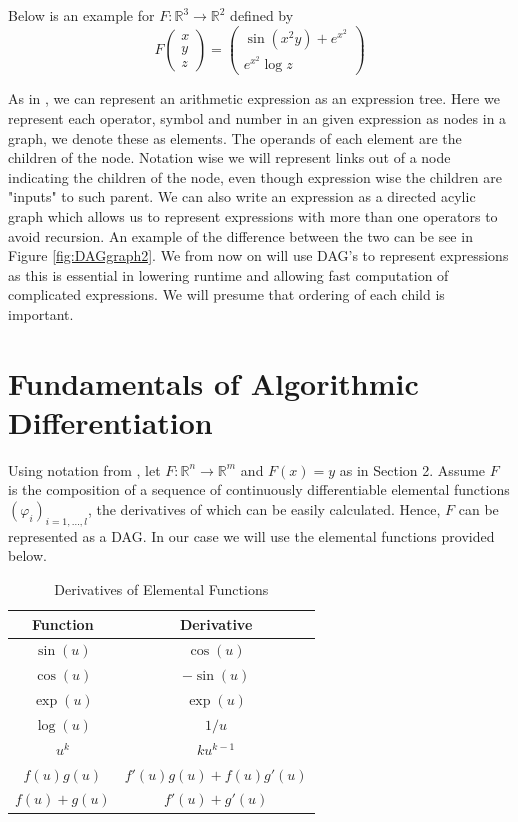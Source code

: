 \documentclass{article}
\begin{document}
Below is an example for $F: \mathbb{R}^3 \rightarrow \mathbb{R}^2$ defined by
\begin{equation} \label{example1}
    F \begin{pmatrix}
        x \\ y \\ z
    \end{pmatrix} = \begin{pmatrix}
        \sin (x^2 y) + e^{x^2} \\ e^{x^2} \log z
    \end{pmatrix}
\end{equation}

As in \cite{PoPBook}, we can represent an arithmetic expression as an expression tree. Here we represent each operator, symbol and number in an given expression as nodes in a graph, we denote these as elements. The operands of each element are the children of the node. Notation wise we will represent links out of a node indicating the children of the node, even though expression wise the children are "inputs" to such parent. We can also write an expression as a directed acylic graph which allows us to represent expressions with more than one operators to avoid recursion. An example of the difference between the two can be see in Figure \ref{fig:DAGgraph2}. We from now on will use DAG's to represent expressions as this is essential in lowering runtime and allowing fast computation of complicated expressions. We will presume that ordering of each child is important.

\section{Fundamentals of Algorithmic Differentiation}

Using notation from  \cite{evald}, let $F: \mathbb{R}^n \rightarrow \mathbb{R}^m$ and $F(x) = y$ as in Section 2. Assume $F$ is the composition of a sequence of continuously differentiable elemental functions $(\varphi_i)_{i=1,\ldots, l}$, the derivatives of which can be easily calculated. Hence, $F$ can be represented as a DAG. In our case we will use the elemental functions provided below.

\begin{table}[h]
    \centering
    \begin{tabular}{|c|c|}
        \hline
        Function & Derivative \\
        \hline
        $\sin(u)$ & $\cos(u)$ \\
        $\cos(u)$ & $-\sin(u)$ \\
        $\exp(u) $ & $\exp(u)$ \\
        $\log(u)$ & $1/u$ \\
        $u^k$ & $k u^{k-1}$ \\
        $f(u)g(u)$ & $f'(u)g(u) + f(u)g'(u)$ \\
        $f(u) + g(u)$ & $f'(u) + g'(u)$ \\
        \hline
    \end{tabular}
    \caption{Derivatives of Elemental Functions}
    \label{tab:elemental}
\end{table}
\end{document}
